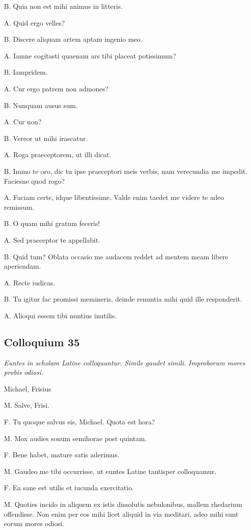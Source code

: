 \documentclass{article}
\begin{document}
B. Quia non est mihi animus in litteris. 

A. Quid ergo velles?

B. Discere aliquam artem aptam ingenio meo. 

A. Iamne cogitasti quaenam ars tibi placeat potissimum?

B. Iampridem. 

A. Cur ergo patrem non admones?

B. Nunquam ausus sum. 

A. Cur non?

B. Vereor ut mihi irascatur. 

A. Roga praeceptorem, ut illi dicat. 

B. Immo te oro, dic tu ipse praeceptori meis verbis, nam verecundia me impedit. Faciesne quod rogo?

A. Faciam certe, idque libentissime. Valde enim taedet me videre te adeo remissum. 

B. O quam mihi gratum feceris!

A. Sed praeceptor te appellabit. 

B. Quid tum? Oblata occasio me audacem reddet ad mentem meam libere aperiendam. 

A. Recte iudicas. 

B. Tu igitur fac promissi memineris, deinde renuntia mihi quid ille responderit.

A. Alioqui essem tibi nuntius inutilis. 

\subsection{Colloquium 35}
\emph{Euntes in scholam Latine colloquuntur. Simile gaudet simili. Improborum mores probis odiosi.}

Michael, Frisius

M. Salve, Frisi. 

F. Tu quoque salvus sis, Michael. Quota est hora?

M. Mox audies sonum semihorae post quintam. 

F. Bene habet, mature satis aderimus. 

M. Gaudeo me tibi occurrisse, ut euntes Latine tantisper colloquamur.

F. Ea sane est utilis et iucunda exercitatio. 

M. Quoties incido in aliquem ex istis dissolutis nebulonibus, mallem rhedarium offendisse. Non enim per eos mihi licet aliquid in via meditari, adeo mihi sunt eorum mores odiosi.
\end{document}
